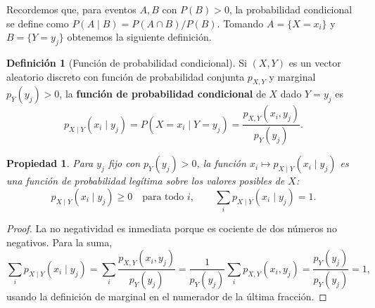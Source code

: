 \documentclass[11pt,a4paper]{article}
\theoremstyle{plain}
\newtheorem{propiedad}[teorema]{Propiedad}
\theoremstyle{definition}
\newtheorem{definicion}[teorema]{Definición}
\theoremstyle{remark}
\begin{document}
Recordemos que, para eventos $A,B$ con $P(B)>0$, la probabilidad condicional se define como $P(A\mid B) = P(A\cap B)/P(B)$. Tomando $A=\{X=x_i\}$ y $B=\{Y=y_j\}$ obtenemos la siguiente definición.

\begin{definicion}[Función de probabilidad condicional]
Si $(X,Y)$ es un vector aleatorio discreto con función de probabilidad conjunta $p_{X,Y}$ y marginal $p_Y(y_j)>0$, la \textbf{función de probabilidad condicional} de $X$ dado $Y=y_j$ es
\[
p_{X\mid Y}(x_i\mid y_j) = P(X=x_i\mid Y=y_j) = \frac{p_{X,Y}(x_i,y_j)}{p_Y(y_j)}.
\]
\end{definicion}

\begin{propiedad}
Para $y_j$ fijo con $p_Y(y_j)>0$, la función $x_i\mapsto p_{X\mid Y}(x_i\mid y_j)$ es una función de probabilidad legítima sobre los valores posibles de $X$:
\[
p_{X\mid Y}(x_i\mid y_j)\ge0 \quad\text{para todo } i, \qquad \sum_i p_{X\mid Y}(x_i\mid y_j) = 1.
\]
\end{propiedad}

\begin{proof}
La no negatividad es inmediata porque es cociente de dos números no negativos. Para la suma,
\[
\sum_i p_{X\mid Y}(x_i\mid y_j) = \sum_i \frac{p_{X,Y}(x_i,y_j)}{p_Y(y_j)} = \frac{1}{p_Y(y_j)}\sum_i p_{X,Y}(x_i,y_j) = \frac{p_Y(y_j)}{p_Y(y_j)} = 1,
\]
usando la definición de marginal en el numerador de la última fracción.
\end{proof}
\end{document}
